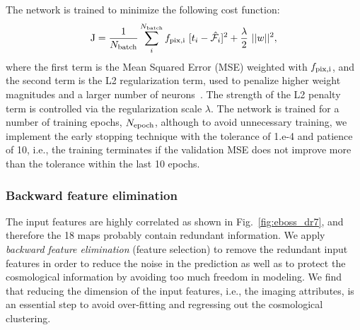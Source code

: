 The network is trained to minimize the following cost function:
\begin{equation}\label{eq:cost}
    \text{J} = \frac{1}{N_{{\rm batch}}}\sum_{i}^{N_{{\rm batch}}}f_{\rm pix, i}~[t_{i} - \hat{\mathcal{F}_{i}}]^{2} + \frac{\lambda}{2} ~ ||w||^{2} ,
\end{equation}   
%
where the first term is the Mean Squared Error (MSE) weighted with $f_{\rm pix,i}$, and the second term is the L2 regularization term, used to penalize higher weight magnitudes and a larger number of neurons~\citep{hoerl1970ridge}. The strength of the L2 penalty term is controlled via the regularization scale $\lambda$. The network is trained for a number of training epochs, $N_{{\rm epoch}}$, although to avoid unnecessary training, we implement the early stopping technique with the tolerance of 1.e-4 and patience of 10, i.e., the training terminates if the validation MSE does not improve more than the tolerance within the last 10 epochs.\\

\subsubsection{Backward feature elimination}
    
The input features are highly correlated as shown in Fig.~\ref{fig:eboss_dr7}, and therefore the 18 maps probably contain redundant information.
We apply \textit{backward feature elimination} (feature selection) to remove the redundant input features in order to reduce the noise in the prediction as well as to protect the cosmological information by avoiding too much freedom in modeling. We find that reducing the dimension of the input features, i.e., the imaging attributes, is an essential step to avoid over-fitting and regressing out the cosmological clustering.\\

